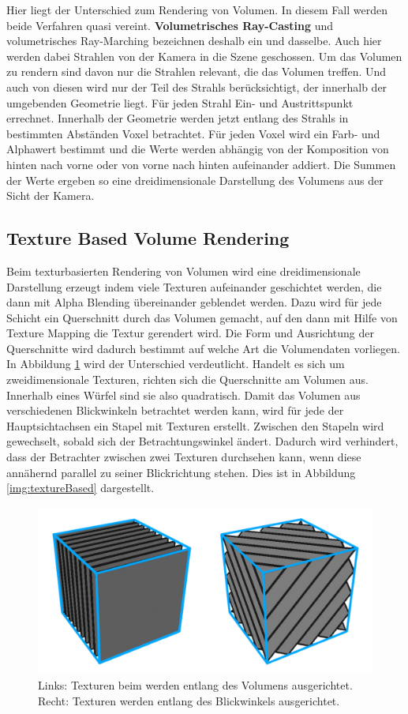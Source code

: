 Hier liegt der Unterschied zum Rendering von Volumen. In diesem Fall werden beide Verfahren quasi vereint. \textbf{Volumetrisches Ray-Casting} und volumetrisches Ray-Marching bezeichnen deshalb ein und dasselbe. Auch hier werden dabei Strahlen von der Kamera in die Szene geschossen. Um das Volumen zu rendern sind davon nur die Strahlen relevant, die das Volumen treffen. Und auch von diesen wird nur der Teil des Strahls berücksichtigt, der innerhalb der umgebenden Geometrie liegt. Für jeden Strahl Ein- und Austrittspunkt errechnet. Innerhalb der Geometrie werden jetzt entlang des Strahls in bestimmten Abständen Voxel betrachtet. Für jeden Voxel wird ein Farb- und Alphawert bestimmt und die Werte werden abhängig von der Komposition von hinten nach vorne oder von vorne nach hinten aufeinander addiert. Die Summen der Werte ergeben so eine dreidimensionale Darstellung des Volumens aus der Sicht der Kamera.

\subsection{Texture Based Volume Rendering}

Beim texturbasierten Rendering von Volumen wird eine dreidimensionale Darstellung erzeugt indem viele Texturen aufeinander geschichtet werden, die dann mit Alpha Blending übereinander geblendet werden. Dazu wird für jede Schicht ein Querschnitt durch das Volumen gemacht, auf den dann mit Hilfe von Texture Mapping die Textur gerendert wird.
Die Form und Ausrichtung der Querschnitte wird dadurch bestimmt auf welche Art die Volumendaten vorliegen. In Abbildung \ref{img:2D3DTex} wird der Unterschied verdeutlicht. Handelt es sich um zweidimensionale Texturen,  richten sich die Querschnitte am Volumen aus. Innerhalb eines Würfel sind sie also quadratisch. Damit das Volumen aus verschiedenen Blickwinkeln betrachtet werden kann, wird für jede der Hauptsichtachsen ein Stapel mit Texturen erstellt. Zwischen den Stapeln wird gewechselt, sobald sich der Betrachtungswinkel ändert. Dadurch wird verhindert, dass der Betrachter zwischen zwei Texturen durchsehen kann, wenn diese annähernd parallel zu seiner Blickrichtung stehen. Dies ist in Abbildung \ref{img:textureBased} dargestellt.

\begin{figure}
	\centering
	\includegraphics[width=0.7\linewidth]{images/texture_2d3d.pdf}
	\caption{Links: Texturen beim werden entlang des Volumens ausgerichtet. Recht: Texturen werden entlang des Blickwinkels ausgerichtet.}
	\label{img:2D3DTex}
\end{figure}

